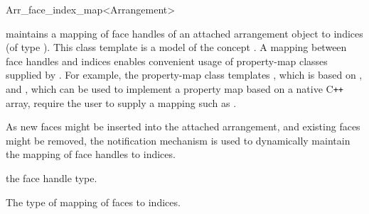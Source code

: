 
\ccRefPageBegin

\begin{ccRefClass}{Arr_face_index_map<Arrangement>}
\label{arr_ref:arr_face_index_map}

\ccDefinition

\ccClassTemplateName{} maintains a mapping of face handles of an
attached arrangement object to indices (of type ).
This class template is a model of the \boost{} concept
. A mapping between face handles and indices
enables convenient usage of property-map classes supplied by \boost{}.
For example, the property-map class templates
, which is based on ,
and , which can be used to implement
a property map based on a native C\hbox{\tt ++} array, require the
user to supply a mapping such as \ccClassTemplateName{}.

As new faces might be inserted into the attached arrangement, and
existing faces might be removed, the notification mechanism is used
to dynamically maintain the mapping of face handles to indices.


\ccIsModel
  
\ccInheritsFrom{}


\ccTypes


    {the face handle type.}

\ccGlue
{}
\ccGlue
{}
\ccGlue
{}

    {The type of mapping of faces to indices.}


\end{ccRefClass}
